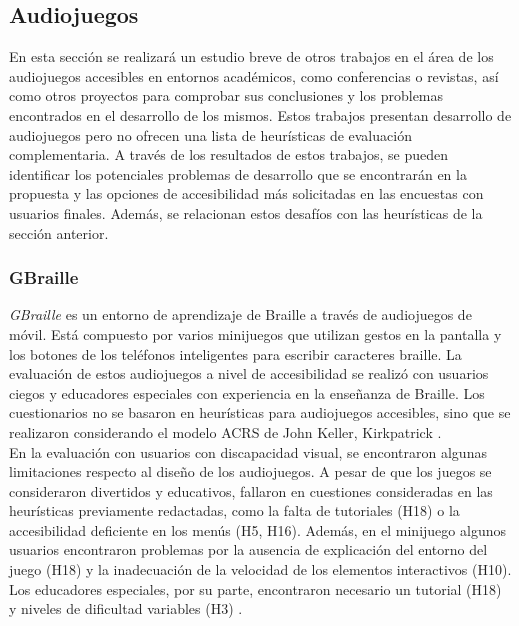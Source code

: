  
 \subsection{Audiojuegos}
 En esta sección se realizará un estudio breve de otros trabajos en el área de los audiojuegos accesibles en entornos académicos, como conferencias o revistas, así como otros proyectos para comprobar sus conclusiones y los problemas encontrados en el desarrollo de los mismos. Estos trabajos presentan desarrollo de audiojuegos pero no ofrecen una lista de heurísticas de evaluación complementaria. A través de los resultados de estos trabajos, se pueden identificar los potenciales problemas de desarrollo que se encontrarán en la propuesta y las opciones de accesibilidad más solicitadas en las encuestas con usuarios finales. Además, se relacionan estos desafíos con las heurísticas de la sección anterior. \\
 
\subsubsection{GBraille}
\textit{GBraille} es un entorno de aprendizaje de Braille a través de audiojuegos de móvil. Está compuesto por varios minijuegos que utilizan gestos en la pantalla y los botones de los teléfonos inteligentes para escribir caracteres braille. La evaluación de estos audiojuegos a nivel de accesibilidad se realizó con usuarios ciegos y educadores especiales con experiencia en la enseñanza de Braille. Los cuestionarios no se basaron en heurísticas para audiojuegos accesibles, sino que se realizaron considerando el modelo ACRS de John Keller, Kirkpatrick \cite[p ~235]{araujoDesignUsabilityBraillebased2016}. \\

En la evaluación con usuarios con discapacidad visual, se encontraron algunas limitaciones respecto al diseño de los audiojuegos. A pesar de que los juegos se consideraron divertidos y educativos, fallaron en cuestiones consideradas en las heurísticas previamente redactadas, como la falta de tutoriales (H18) o la accesibilidad deficiente en los menús (H5, H16). Además, en el minijuego \textit{} algunos usuarios encontraron problemas por la ausencia de explicación del entorno del juego (H18) y la inadecuación de la velocidad de los elementos interactivos (H10). Los educadores especiales, por su parte, encontraron necesario un tutorial (H18) y niveles de dificultad variables (H3) \cite{araujoDesignUsabilityBraillebased2016}. \\

